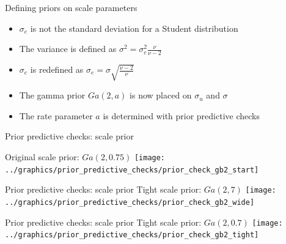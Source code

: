 \begin{frame}{Defining priors on scale parameters}
    \begin{itemize}
        \item $\sigma_e$ is not the standard deviation for a Student distribution
        \item The variance is defined as $\sigma^2 = \sigma_e^2\frac {\nu} {\nu -2}$
        \item $\sigma_e$ is redefined as $\sigma_e = \sigma \sqrt{\frac{\nu -2}{\nu}}$
        \item The gamma prior $Ga(2, a)$ is now placed on $\sigma_u$ and $\sigma$
        \item The rate parameter $a$ is determined with prior predictive checks
    \end{itemize}
\end{frame}

\begin{frame}{Prior predictive checks: scale prior}

    \centering
    Original scale prior: $Ga(2, 0.75)$
    \texttt{[image: ../graphics/prior\_predictive\_checks/prior\_check\_gb2\_start]}
\end{frame}

\begin{frame}{Prior predictive checks: scale prior}
    \centering
    Tight scale prior: $Ga(2, 7)$
    \texttt{[image: ../graphics/prior\_predictive\_checks/prior\_check\_gb2\_wide]}
\end{frame}

\begin{frame}{Prior predictive checks: scale prior}
    \centering
    Tight scale prior: $Ga(2, 0.7)$
    \texttt{[image: ../graphics/prior\_predictive\_checks/prior\_check\_gb2\_tight]}
\end{frame}